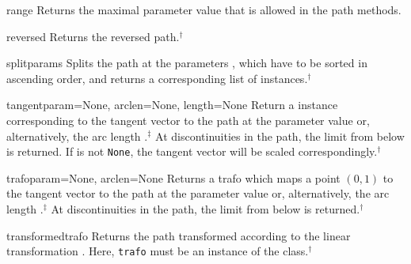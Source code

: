 \begin{methoddesc}{range}{}
  Returns the maximal parameter value  that is allowed in the
  path methods.
\end{methoddesc}

\begin{methoddesc}{reversed}{}
  Returns the reversed path.$^\dagger$
\end{methoddesc}

\begin{methoddesc}{split}{params}
  Splits the path at the parameters , which have to be
  sorted in ascending order, and returns a corresponding list of
   instances.$^\dagger$
\end{methoddesc}

\begin{methoddesc}{tangent}{param=None, arclen=None, length=None}
  Return a  instance corresponding to the tangent vector
  to the path at the parameter value  or, alternatively,
  the arc length .$^\ddagger$ At discontinuities in the
  path, the limit from below is returned. If  is not
  \texttt{None}, the tangent vector will be scaled
  correspondingly.$^\dagger$
\end{methoddesc}


\begin{methoddesc}{trafo}{param=None, arclen=None}
  Returns a trafo which maps a point $(0, 1)$ to the tangent vector to
  the path at the parameter value  or, alternatively, the
  arc length .$^\ddagger$ At discontinuities in the path,
  the limit from below is returned.$^\dagger$
\end{methoddesc}

\begin{methoddesc}{transformed}{trafo}
  Returns the path transformed according to the linear transformation
  . Here, \texttt{trafo} must be an instance of the
   class.$^\dagger$
\end{methoddesc}

